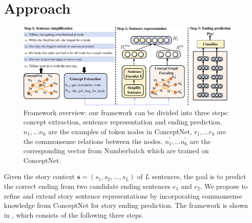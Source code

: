 \section{Approach}
\label{sec:approach}
\begin{figure}
\centering
\includegraphics[width=2\columnwidth]{pictures/model.eps}
\caption{Framework overview: our framework can be divided into three steps: 
concept extraction, sentence representation and ending prediction. 
${n_1,...n_6}$ are the examples of token nodes in ConceptNet, 
${r_1,...r_6}$  are the commonsense relations between the nodes. 
${n_1^{'},...n_6^{'}}$ are the corresponding vector from Numberbatch
 which are trained on ConceptNet.
}
\label{fig:model}
\end{figure}



Given the story context $\textbf{s} = (s_1, s_2, ..., s_L)$ of $L$ sentences,
the goal is to predict the correct ending from 
two candidate ending sentences $e_1$ and $e_2$.
We propose to refine and extend story sentence representations
by incorporating commonsense knowledge from ConceptNet for story ending prediction.
The framework is shown in , which consists of 
the following three steps. 


